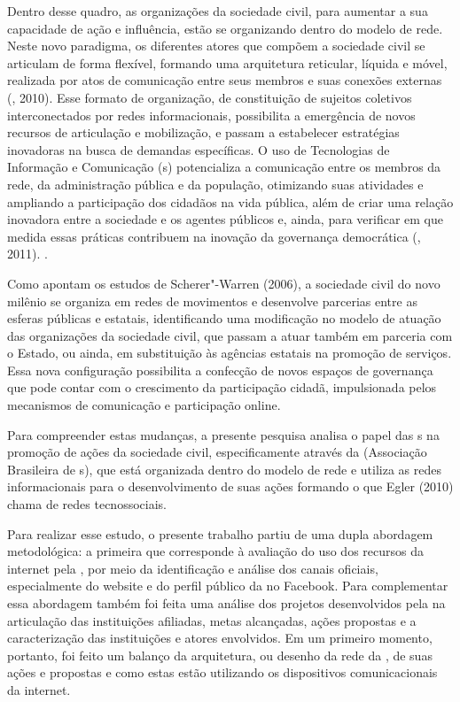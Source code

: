 Dentro desse quadro, as organizações da sociedade civil, para aumentar a
sua capacidade de ação e influência, estão se organizando dentro do
modelo de rede. Neste novo paradigma, os diferentes atores que compõem a
sociedade civil se articulam de forma flexível, formando uma arquitetura
reticular, líquida e móvel, realizada por atos de comunicação entre seus
membros e suas conexões externas (, 2010). Esse formato de
organização, de constituição de sujeitos coletivos interconectados por
redes informacionais, possibilita a emergência de novos recursos de
articulação e mobilização, e passam a estabelecer estratégias inovadoras
na busca de demandas específicas. O uso de Tecnologias de Informação e
Comunicação (s) potencializa a comunicação entre os membros da rede,
da administração pública e da população, otimizando suas atividades e
ampliando a participação dos cidadãos na vida pública, além de criar uma
relação inovadora entre a sociedade e os agentes públicos e, ainda, para
verificar em que medida essas práticas contribuem na inovação da
governança democrática (, 2011). .

Como apontam os estudos de Scherer"-Warren (2006), a sociedade civil do
novo milênio se organiza em redes de movimentos e desenvolve parcerias
entre as esferas públicas e estatais, identificando uma modificação no
modelo de atuação das organizações da sociedade civil, que passam a
atuar também em parceria com o Estado, ou ainda, em substituição às
agências estatais na promoção de serviços. Essa nova configuração
possibilita a confecção de novos espaços de governança que pode contar
com o crescimento da participação cidadã, impulsionada pelos mecanismos
de comunicação e participação online.

Para compreender estas mudanças, a presente pesquisa analisa o papel das
s na promoção de ações da sociedade civil, especificamente através da
 (Associação Brasileira de s), que está organizada dentro do
modelo de rede e utiliza as redes informacionais para o desenvolvimento
de suas ações formando o que Egler (2010) chama de redes tecnossociais.

Para realizar esse estudo, o presente trabalho partiu de uma dupla
abordagem metodológica: a primeira que corresponde à avaliação do uso
dos recursos da internet pela , por meio da identificação e análise
dos canais oficiais, especialmente do website e do perfil público da
 no Facebook. Para complementar essa abordagem também foi feita uma
análise dos projetos desenvolvidos pela  na articulação das
instituições afiliadas, metas alcançadas, ações propostas e a
caracterização das instituições e atores envolvidos. Em um primeiro
momento, portanto, foi feito um balanço da arquitetura, ou desenho da
rede da , de suas ações e propostas e como estas estão utilizando
os dispositivos comunicacionais da internet.

